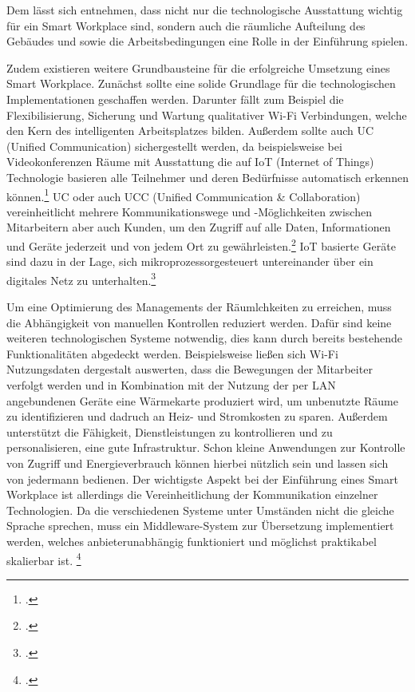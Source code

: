 Dem lässt sich entnehmen, dass nicht nur die technologische Ausstattung wichtig für ein Smart Workplace sind, sondern auch die räumliche Aufteilung des Gebäudes und sowie die Arbeitsbedingungen eine Rolle in der Einführung spielen.

Zudem existieren weitere Grundbausteine für die erfolgreiche Umsetzung eines Smart Workplace. Zunächst sollte eine solide Grundlage für die technologischen Implementationen geschaffen werden. Darunter fällt zum Beispiel die Flexibilisierung, Sicherung und Wartung qualitativer Wi-Fi Verbindungen, welche den Kern des intelligenten Arbeitsplatzes bilden. Außerdem sollte auch UC (Unified Communication) sichergestellt werden, da beispielsweise bei Videokonferenzen Räume mit Ausstattung die auf IoT (Internet of Things) Technologie basieren alle Teilnehmer und deren Bedürfnisse automatisch erkennen können.\footcite[Vgl.][]{SCmagazineUK} UC oder auch UCC (Unified Communication \& Collaboration) vereinheitlicht mehrere Kommunikationswege und -Möglichkeiten zwischen Mitarbeitern aber auch Kunden, um den Zugriff auf alle Daten, Informationen und Geräte jederzeit und von jedem Ort zu gewährleisten.\footcite[Vgl.][]{CompWoche} IoT basierte Geräte sind dazu in der Lage, sich mikroprozessorgesteuert untereinander über ein digitales Netz zu unterhalten.\footcite[Vgl.][]{mittelstand}

Um eine Optimierung des Managements der Räumlchkeiten zu erreichen, muss die Abhängigkeit von manuellen Kontrollen reduziert werden. Dafür sind keine weiteren technologischen Systeme notwendig, dies kann durch bereits bestehende Funktionalitäten abgedeckt werden. Beispielsweise ließen sich Wi-Fi Nutzungsdaten dergestalt auswerten, dass die Bewegungen der Mitarbeiter verfolgt werden und in Kombination mit der Nutzung der per LAN angebundenen Geräte eine Wärmekarte produziert wird, um unbenutzte Räume zu identifizieren und dadruch an Heiz- und Stromkosten zu sparen. Außerdem unterstützt die Fähigkeit, Dienstleistungen zu kontrollieren und zu personalisieren, eine gute Infrastruktur. Schon kleine Anwendungen zur Kontrolle von Zugriff und Energieverbrauch können hierbei nützlich sein und lassen sich von jedermann bedienen. Der wichtigste Aspekt bei der Einführung eines Smart Workplace ist allerdings die Vereinheitlichung der Kommunikation einzelner Technologien. Da die verschiedenen Systeme unter Umständen nicht die gleiche Sprache sprechen, muss ein Middleware-System zur Übersetzung implementiert werden, welches anbieterunabhängig funktioniert und möglichst praktikabel skalierbar ist.
\footcite[Vgl.][]{SCmagazineUK}
